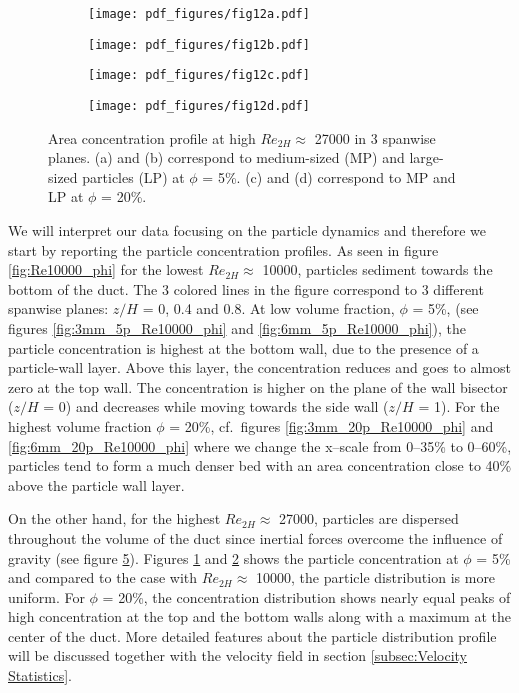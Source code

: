 \documentclass{jfm}
\begin{document}
\begin{figure}
\centering
\begin{subfigure}{.4\textwidth}
  \centering
  \texttt{[image: pdf\_figures/fig12a.pdf]}
  \caption{}
  \label{fig:3mm_5p_Re27000_phi}
\end{subfigure}%
\begin{subfigure}{.4\textwidth}
  \centering
  \texttt{[image: pdf\_figures/fig12b.pdf]}
  \caption{}
  \label{fig:6mm_5p_Re27000_phi}
\end{subfigure}
\begin{subfigure}{.4\textwidth}
  \centering
  \texttt{[image: pdf\_figures/fig12c.pdf]}
  \caption{}
  \label{fig:3mm_20p_Re27000_phi}
\end{subfigure}%
\begin{subfigure}{.4\textwidth}
  \centering
  \texttt{[image: pdf\_figures/fig12d.pdf]}
  \caption{}
  \label{fig:6mm_20p_Re27000_phi}
\end{subfigure}
\caption{Area concentration profile at high $Re_{2H}\approx$ 27000 in 3 spanwise planes. (a) and (b) correspond to medium-sized (MP) and large-sized particles (LP) at $\phi$ = 5\%. (c) and (d) correspond to MP and LP at $\phi$ = 20\%.}
\label{fig:Re27000_phi}
\end{figure}

We will interpret our data focusing on the particle dynamics and therefore we start by reporting the particle concentration profiles. As seen in figure \ref{fig:Re10000_phi} for the lowest $Re_{2H}\approx$ 10000, particles sediment towards the bottom of the duct. The 3 colored lines in the figure correspond to 3 different spanwise planes: $z/H$ = 0, 0.4 and 0.8. At low volume fraction, $\phi$ = 5\%, (see figures \ref{fig:3mm_5p_Re10000_phi} and \ref{fig:6mm_5p_Re10000_phi}), the particle concentration is highest at the bottom wall, due to the presence of a particle-wall layer. Above this layer, the concentration reduces and goes to almost zero at the top wall. The concentration is higher on the plane of the wall bisector ($z/H$ = 0) and decreases while moving towards the side wall ($z/H$ = 1). For the highest volume fraction $\phi$ = 20\%, cf.\ figures \ref{fig:3mm_20p_Re10000_phi} and \ref{fig:6mm_20p_Re10000_phi} 
where we change the x--scale from 0--35\% to 0--60\%, particles tend to form a much denser bed with an area concentration close to 40\% above the particle wall layer. 


On the other hand, for the highest $Re_{2H}\approx$ 27000, particles are dispersed throughout the volume of the duct since inertial forces overcome the influence of gravity (see figure \ref{fig:Re27000_phi}). Figures \ref{fig:3mm_5p_Re27000_phi} and  \ref{fig:6mm_5p_Re27000_phi} shows the particle concentration at $\phi$ = 5\% and compared to the case with $Re_{2H}\approx$ 10000, the particle distribution is more uniform. For $\phi$ = 20\%, the concentration distribution shows nearly equal peaks of high concentration at the top and the bottom walls along with a maximum at the center of the duct. More detailed features about the particle distribution profile will be discussed together with the velocity field in section \ref{subsec:Velocity Statistics}.
\end{document}
